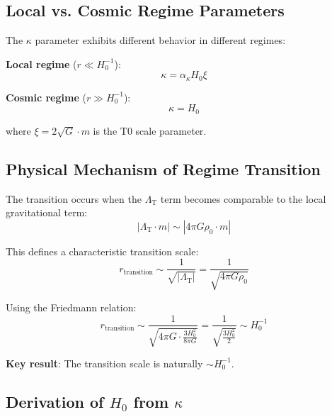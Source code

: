 \documentclass[12pt,a4paper]{article}
\newcommand{\xipar}{\xi}
\newcommand{\LambdaT}{\Lambda_{\text{T}}}
\newcommand{\Hzero}{H_0}
\newcommand{\kappaparam}{\kappa}
\begin{document}
	\subsection{Local vs. Cosmic Regime Parameters}
	\label{subsec:regime_parameters}
	
	The $\kappa$ parameter exhibits different behavior in different regimes:
	
	\textbf{Local regime} ($r \ll \Hzero^{-1}$):
	\begin{equation}
		\kappaparam = \alpha_{\kappa} \Hzero \xipar
		\label{eq:kappa_local}
	\end{equation}
	
	\textbf{Cosmic regime} ($r \gg \Hzero^{-1}$):
	\begin{equation}
		\boxed{\kappaparam = \Hzero}
		\label{eq:kappa_cosmic}
	\end{equation}
	
	where $\xipar = 2\sqrt{G} \cdot m$ is the T0 scale parameter.
	
	\subsection{Physical Mechanism of Regime Transition}
	\label{subsec:regime_mechanism}
	
	The transition occurs when the $\LambdaT$ term becomes comparable to the local gravitational term:
	\begin{equation}
		|\LambdaT \cdot m| \sim |4\pi G \rho_0 \cdot m|
	\end{equation}
	
	This defines a characteristic transition scale:
	\begin{equation}
		r_{\text{transition}} \sim \frac{1}{\sqrt{|\LambdaT|}} = \frac{1}{\sqrt{4\pi G \rho_0}}
	\end{equation}
	
	Using the Friedmann relation:
	\begin{equation}
		r_{\text{transition}} \sim \frac{1}{\sqrt{4\pi G \cdot \frac{3\Hzero^2}{8\pi G}}} = \frac{1}{\sqrt{\frac{3\Hzero^2}{2}}} \sim \Hzero^{-1}
	\end{equation}
	
	\textbf{Key result}: The transition scale is naturally $\sim \Hzero^{-1}$.
	
	\subsection{Derivation of $H_0$ from $\kappa$}
	\label{subsec:h0_from_kappa}
	
\end{document}

